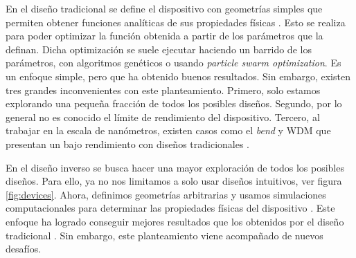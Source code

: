 En el diseño tradicional se define el dispositivo con geometrías simples que permiten obtener funciones analíticas de sus propiedades físicas \citep{Hughes2016, Song2008}. 
Esto se realiza para poder optimizar la función obtenida a partir de los parámetros que la definan. 
Dicha optimización se suele ejecutar haciendo un barrido de los parámetros, con algoritmos genéticos o usando \emph{particle swarm optimization}. 
Es un enfoque simple, pero que ha obtenido buenos resultados. 
Sin embargo, existen tres grandes inconvenientes con este planteamiento. 
Primero, solo estamos explorando una pequeña fracción de todos los posibles diseños.
Segundo, por lo general no es conocido el límite de rendimiento del dispositivo.
Tercero, al trabajar en la escala de nanómetros, existen casos como el \emph{bend} y WDM que presentan un bajo rendimiento con diseños tradicionales \citep{Molesky2018, Su2020}.


En el diseño inverso se busca hacer una mayor exploración de todos los posibles diseños. 
Para ello, ya no nos limitamos a solo usar diseños intuitivos, ver figura \ref{fig:devices}. 
Ahora, definimos geometrías arbitrarias y usamos simulaciones computacionales para determinar las propiedades físicas del dispositivo \citep{Molesky2018, Su2020}. 
Este enfoque ha logrado conseguir mejores resultados que los obtenidos por el diseño tradicional \citep{Su2018, Molesky2018}. 
Sin embargo, este planteamiento viene acompañado de nuevos desafíos.


